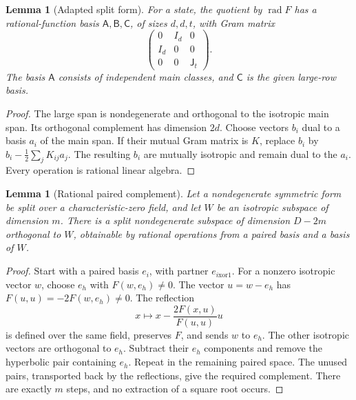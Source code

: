 \documentclass[11pt]{article}
\newtheorem{lemma}[theorem]{Lemma}
\theoremstyle{definition}\newtheorem{definition}[theorem]{Definition}
\theoremstyle{remark}\newtheorem{remark}[theorem]{Remark}
\newcommand{\rad}{\operatorname{rad}}
\newcommand{\J}{\mathsf J}
\newcommand{\B}{\mathsf B}
\newcommand{\A}{\mathsf A}
\begin{document}
\begin{lemma}[Adapted split form]\label{lem:adapted}
For a state, the quotient by $\rad F$ has a rational-function basis $\A,\B,\mathsf C$, of sizes $d,d,t$, with Gram matrix
\begin{equation}\label{eq:adapted}
 \begin{pmatrix}0&I_d&0\\I_d&0&0\\0&0&\J_t\end{pmatrix}.
\end{equation}
The basis $\A$ consists of independent main classes, and $\mathsf C$ is the given large-row basis.
\end{lemma}
\begin{proof}
The large span is nondegenerate and orthogonal to the isotropic main span. Its orthogonal complement has dimension $2d$. Choose vectors $b_i$ dual to a basis $a_i$ of the main span. If their mutual Gram matrix is $K$, replace $b_i$ by $b_i-\frac12\sum_jK_{ij}a_j$. The resulting $b_i$ are mutually isotropic and remain dual to the $a_i$. Every operation is rational linear algebra.
\end{proof}

\begin{lemma}[Rational paired complement]\label{lem:complement}
Let a nondegenerate symmetric form be split over a characteristic-zero field, and let $W$ be an isotropic subspace of dimension $m$. There is a split nondegenerate subspace of dimension $D-2m$ orthogonal to $W$, obtainable by rational operations from a paired basis and a basis of $W$.
\end{lemma}
\begin{proof}
Start with a paired basis $e_i$, with partner $e_{i\mathbin{\mathrm{xor}}1}$. For a nonzero isotropic vector $w$, choose $e_h$ with $F(w,e_h)\ne0$. The vector $u=w-e_h$ has $F(u,u)=-2F(w,e_h)\ne0$. The reflection
\[
 x\longmapsto x-\frac{2F(x,u)}{F(u,u)}u
\]
is defined over the same field, preserves $F$, and sends $w$ to $e_h$. The other isotropic vectors are orthogonal to $e_h$. Subtract their $e_h$ components and remove the hyperbolic pair containing $e_h$. Repeat in the remaining paired space. The unused pairs, transported back by the reflections, give the required complement. There are exactly $m$ steps, and no extraction of a square root occurs.
\end{proof}
\end{document}
